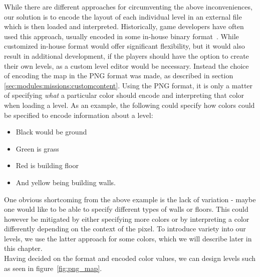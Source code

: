 While there are different approaches for circumventing the above inconveniences, our solution is to encode the layout of each individual level in an external file which is then loaded and interpreted.
Historically, game developers have often used this approach, usually encoded in some in-house binary format~\cite{quake-bsp-format}.
While customized in-house format would offer significant flexibility, but it would also result in additional development, if the players should have the option to create their own levels, as a custom level editor would be necessary.
Instead the choice of encoding the map in the PNG format was made, as described in section \ref{sec:modules:missions:customcontent}.
Using the PNG format, it is only a matter of specifying \textit{what} a particular color should encode and interpreting that color when loading a level.
As an example, the following could specify how colors could be specified to encode information about a level:
\begin{itemize}
    \item Black would be ground
    \item Green is grass
    \item Red is building floor
    \item And yellow being building walls.
\end{itemize}
One obvious shortcoming from the above example is the lack of variation - maybe one would like to be able to specify different types of walls or floors. This could however be mitigated by either specifying more colors or by interpreting a color differently depending on the context of the pixel.
To introduce variety into our levels, we use the latter approach for some colors, which we will describe later in this chapter.
\\

Having decided on the format and encoded color values, we can design levels such as seen in figure~\ref{fig:png_map}.

